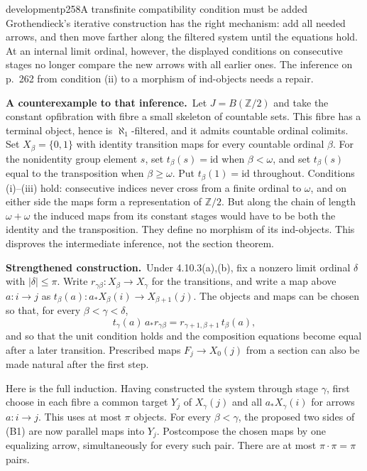 \begin{dcomment}{development}{p258}{A transfinite compatibility condition must be added}
Grothendieck's iterative construction has the right mechanism: add all needed arrows, and then move farther along the filtered system until the equations hold. At an internal limit ordinal, however, the displayed conditions on consecutive stages no longer compare the new arrows with all earlier ones. The inference on p.~262 from condition (ii) to a morphism of ind-objects needs a repair.

\textbf{A counterexample to that inference.}\ours\ Let $J=B(\mathbb Z/2)$ and take the constant opfibration with fibre a small skeleton of countable sets. This fibre has a terminal object, hence is $\aleph_1$-filtered, and it admits countable ordinal colimits. Set $X_\beta=\{0,1\}$ with identity transition maps for every countable ordinal $\beta$. For the nonidentity group element $s$, set $t_\beta(s)=\mathrm{id}$ when $\beta<\omega$, and set $t_\beta(s)$ equal to the transposition when $\beta\geq\omega$. Put $t_\beta(1)=\mathrm{id}$ throughout. Conditions (i)--(iii) hold: consecutive indices never cross from a finite ordinal to $\omega$, and on either side the maps form a representation of $\mathbb Z/2$. But along the chain of length $\omega+\omega$ the induced maps from its constant stages would have to be both the identity and the transposition. They define no morphism of its ind-objects. This disproves the intermediate inference, not the section theorem.

\textbf{Strengthened construction.}\ours\ Under 4.10.3(a),(b), fix a nonzero limit ordinal $\delta$ with $|\delta|\leq\pi$. Write $r_{\gamma\beta}:X_\beta\to X_\gamma$ for the transitions, and write a map above $a:i\to j$ as $t_\beta(a):a_*X_\beta(i)\to X_{\beta+1}(j)$. The objects and maps can be chosen so that, for every $\beta<\gamma<\delta$,
\[
 t_\gamma(a)\,a_*r_{\gamma\beta}
 =r_{\gamma+1,\beta+1}\,t_\beta(a),                       \tag{B1}
\]
and so that the unit condition holds and the composition equations become equal after a later transition. Prescribed maps $F_j\to X_0(j)$ from a section can also be made natural after the first step.

Here is the full induction. Having constructed the system through stage $\gamma$, first choose in each fibre a common target $Y_j$ of $X_\gamma(j)$ and all $a_*X_\gamma(i)$ for arrows $a:i\to j$. This uses at most $\pi$ objects. For every $\beta<\gamma$, the proposed two sides of (B1) are now parallel maps into $Y_j$. Postcompose the chosen maps by one equalizing arrow, simultaneously for every such pair. There are at most $\pi\cdot\pi=\pi$ pairs.


\end{dcomment}
